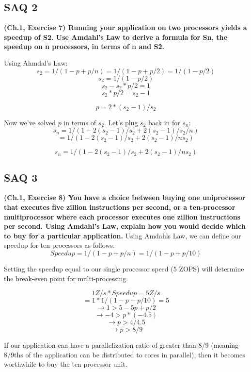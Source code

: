 \documentclass[12pt]{article}
\begin{document}
\subsection*{SAQ 2}
\textbf{(Ch.1, Exercise 7) Running your application on two processors yields a speedup of S2. Use Amdahl’s Law to derive a formula for Sn, the speedup on n processors, in terms of n and S2.
}
\vspace{5mm}

Using Ahmdal's Law:
    $$s_2 = 1/(1-p+p/n) = 1/(1-p+p/2) = 1/(1-p/2)$$
    $$s_2 = 1/(1-p/2)$$
    $$s_2 - s_2*p/2 = 1$$
    $$s_2*p/2 = s_2 - 1$$
    
    $$p = 2*(s_2-1)/s_2$$


Now we've solved $p$ in terms of $s_2$. Let's plug $s_2$ back in for $s_n$:
    $$s_n = 1/(1-2(s_2-1)/s_2 + 2(s_2-1)/s_2/n)$$
    $$= 1/(1-2(s_2-1)/s_2 + 2(s_2-1)/ns_2)$$
    
    $$s_n = 1/(1-2(s_2-1)/s_2 + 2(s_2-1)/ns_2)$$


\subsection*{SAQ 3}
\textbf{(Ch.1, Exercise 8) You have a choice between buying one uniprocessor that executes five zillion instructions per second, or a ten-processor multiprocessor where each processor executes one zillion instructions per second. Using Amdahl’s Law, explain how you would decide which to buy for a particular application.
}
Using Amdahls Law, we can define our speedup for ten-processors as follows:
    $$Speedup = 1/(1-p+p/n) = 1/(1-p+p/10)$$
    
Setting the speedup equal to our single processor speed (5 ZOPS) will determine the break-even point for multi-processing.

    $$1 Z/s * Speedup = 5 Z/s$$
    $$= 1 * 1/(1-p+p/10) = 5$$
    $$\rightarrow 1 > 5 - 5p + p/2$$
    $$\rightarrow -4 > p*(-4.5)$$
    $$\rightarrow p > 4/4.5$$
    $$\rightarrow p > 8/9$$


If our application can have a parallelization ratio of greater than 8/9 (meaning 8/9ths of the application can be distributed to cores in parallel), then it becomes worthwhile to buy the ten-processor unit.
\end{document}
